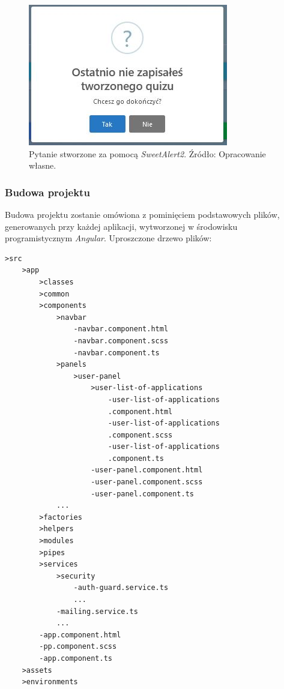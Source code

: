 \documentclass[twoside]{projektInzynierskiMS}
\numberwithin{figure}{section}
\begin{document}
\begin{itemize}
    \begin{figure}[h!]
        \centering
        \includegraphics[scale=0.9]{images/sweetalert.JPG}
        \caption{Pytanie stworzone za pomocą \textit{SweetAlert2}. Źródło: Opracowanie własne.}
        \label{fig:sweetalert}
    \end{figure}

\end{itemize}

\subsubsection{Budowa projektu }
Budowa projektu zostanie omówiona z pominięciem podstawowych plików, generowanych przy każdej aplikacji, wytworzonej w środowisku programistycznym \textit{Angular}.
Uproszczone drzewo plików:
\newpage
\begin{lstlisting}[caption=Uproszczone drzewo plików aplikacji internetowej. Źródło: Opracowanie własne.,captionpos=b]
>src
    >app
        >classes
        >common
        >components
            >navbar
                -navbar.component.html
                -navbar.component.scss
                -navbar.component.ts
            >panels
                >user-panel
                    >user-list-of-applications
                        -user-list-of-applications
                        .component.html
                        -user-list-of-applications
                        .component.scss
                        -user-list-of-applications
                        .component.ts    
                    -user-panel.component.html
                    -user-panel.component.scss
                    -user-panel.component.ts
            ...
        >factories
        >helpers
        >modules
        >pipes
        >services
            >security
                -auth-guard.service.ts
                ...
            -mailing.service.ts
            ...
        -app.component.html
        -pp.component.scss
        -app.component.ts
    >assets
    >environments
\end{lstlisting}
\end{document}
